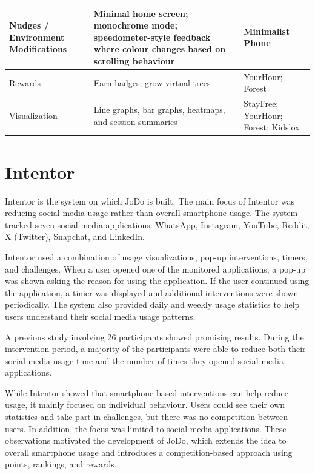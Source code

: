 \documentclass[11pt]{report}
\begin{document}
\begin{center}
\begin{longtable}{|>{\raggedright\arraybackslash}p{}|
                  >{\raggedright\arraybackslash}p{}|
                  >{\raggedright\arraybackslash}p{}|}
Nudges / Environment Modifications & Minimal home screen; monochrome mode; speedometer-style feedback where colour changes based on scrolling behaviour & Minimalist Phone \\
\hline

Rewards & Earn badges; grow virtual trees & YourHour; Forest \\
\hline

Visualization & Line graphs, bar graphs, heatmaps, and session summaries & StayFree; YourHour; Forest; Kidslox \\
\hline

\end{longtable}
\end{center}

\section{Intentor}

Intentor is the system on which JoDo is built. The main focus of Intentor was reducing 
social media usage rather than overall smartphone usage. The system tracked seven 
social media applications: WhatsApp, Instagram, YouTube, Reddit, X (Twitter), Snapchat, 
and LinkedIn.

Intentor used a combination of usage visualizations, pop-up interventions, timers, and 
challenges. When a user opened one of the monitored applications, a pop-up was shown 
asking the reason for using the application. If the user continued using the application, 
a timer was displayed and additional interventions were shown periodically. The system 
also provided daily and weekly usage statistics to help users understand their social 
media usage patterns.

A previous study involving 26 participants showed promising results. During the 
intervention period, a majority of the participants were able to reduce both their 
social media usage time and the number of times they opened social media applications.

While Intentor showed that smartphone-based interventions can help reduce usage, it 
mainly focused on individual behaviour. Users could see their own statistics and take 
part in challenges, but there was no competition between users. In addition, the focus 
was limited to social media applications. These observations motivated the development of 
JoDo, which extends the idea to overall smartphone usage and introduces a 
competition-based approach using points, rankings, and rewards.
\end{document}
